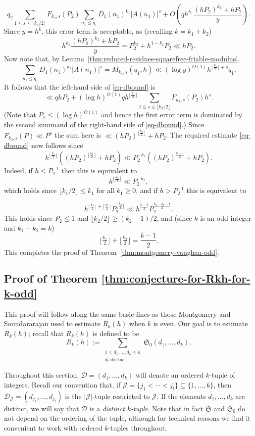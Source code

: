\documentclass[11pt,letterpaper]{amsart}
\newcommand{\abs}[1]{\left\lvert #1\right\rvert}
\newcommand{\brac}[1]{\left( #1\right)}
\theoremstyle{definition}
\begin{document}
\[q_2\sum_{1\leq s\leq \lfloor k_2/2\rfloor}F_{k_2,s}(P_2)\sum_{n_1\leq q_1}D_1(n_1)^{k_1}\abs{A(n_1)}^s+O\brac{qh^{k_1}\frac{(hP_2)^{k_2}+hP_2}{y}}.\]
Since $y=h^k$, this error term is acceptable, as (recalling $k=k_1+k_2$)
\[h^{k_1}\frac{(hP_2)^{k_2}+hP_2}{y}=P_2^{k_2}+h^{1-k_2}P_2\ll hP_2.\]
Now note that, by Lemma~\ref{thm:reduced-residues-squarefree-friable-modulus}, 
\[\sum_{n_1\leq q_1}D_1(n_1)^{k_1}\abs{A(n_1)}^s=M_{k_1,s}(q_1,h)\ll (\log y)^{O(1)}h^{\lfloor \frac{k_1}{2}\rfloor+s}q_1.\]
It follows that the left-hand side of \eqref{eq-dbound} is 
\[\ll qhP_2+(\log h)^{O(1)}qh^{\lfloor \frac{k_1}{2}\rfloor}\sum_{1\leq s\leq \lfloor k_2/2\rfloor}F_{k_2,s}(P_2)h^s.\]
(Note that $P_1\leq (\log h)^{O(1)}$ and hence the first error term is dominated by the second summand of the right-hand side of \eqref{eq-dbound}.) Since $F_{k_2,s}(P)\ll P^s$ the sum here is $\ll (hP_2)^{\lfloor \frac{k_2}{2}\rfloor}+hP_2$. The required estimate \eqref{eq-dbound} now follows since
\[h^{\lfloor \frac{k_1}{2}\rfloor}\brac{(hP_2)^{\lfloor \frac{k_2}{2}\rfloor}+hP_2}\ll P_2^{-k_1}\brac{(hP_2)^{\frac{k-1}{2}}+hP_2}.\]
Indeed, if $h\leq P_2^{-1}$ then this is equivalent to
\[h^{\lfloor \frac{k_1}{2}\rfloor}\ll P_2^{-k_1},\]
which holds since $\lfloor k_1/2\rfloor \leq k_1$ for all $k_1\geq 0$, and if $h>P_2^{-1}$ this is equivalent to 

\[h^{\lfloor \frac{k_1}{2}\rfloor+\lfloor \frac{k_2}{2}\rfloor}P_2^{\lfloor \frac{k_2}{2}\rfloor}\ll h^{\frac{k-1}{2}}P_2^{\frac{k_2-k_1-1}{2}}.\]
This holds since $P_2\leq 1$ and $\lfloor k_2/2\rfloor \geq (k_2-1)/2$, and (since $k$ is an odd integer and $k_1+k_2=k$)
\[\lfloor\tfrac{k_1}{2}\rfloor+\lfloor \tfrac{k_2}{2}\rfloor=\frac{k-1}{2}.\]
This completes the proof of Theorem~\ref{thm:montgomery-vaughan-odd}.

\subsection{Proof of Theorem \ref{thm:conjecture-for-Rkh-for-k-odd}}

This proof will follow along the same basic lines as those Montgomery and Soundararajan \cite{MS04} used to estimate $R_k(h)$ when $k$ is even. Our goal is to estimate $R_k(h)$; recall that $R_k(h)$ is defined to be
\[R_k(h) := \sum_{\substack{1\leq d_1,\ldots,d_k\leq h\\ d_i\textrm{ distinct}}}\mathfrak{S}_0(d_1,\ldots,d_k).\]

Throughout this section, $\mathcal D = (d_1, \dots, d_k)$ will denote an ordered $k$-tuple of integers. Recall our convention that, if $\mathcal{J}=\{j_1<\cdots<j_t\}\subseteq \{1,\ldots,k\}$, then $\mathcal{D}_{\mathcal{J}}=(d_{j_1},\ldots,d_{j_t})$ is the $\abs{\mathcal{J}}$-tuple restricted to $\mathcal{J}$. If the elements $d_1, \dots, d_k$ are distinct, we will say that $\mathcal D$ is a \emph{distinct $k$-tuple}. Note that in fact $\mathfrak{S}$ and $\mathfrak{S}_0$ do not depend on the ordering of the tuple, although for technical reasons we find it convenient to work with ordered $k$-tuples throughout.
\end{document}
